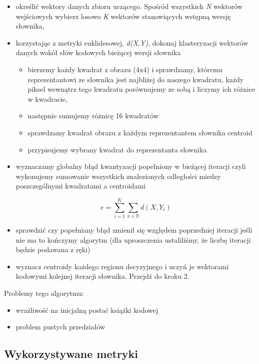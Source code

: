 \documentclass{article}
\begin{document}
\begin{itemize} 
\item określić wektory danych zbioru uczącego. Spośród wszystkich \textit{N} wektorów wejściowych wybierz losowo \textit{K} wektorów stanowiących wstępną wersję słownika,
\item korzystając z metryki euklidesowej, \textit{d(X,Y)}, dokonaj klasteryzacji wektorów danych wokół słów kodowych bieżącej wersji słownika
     \begin{itemize}
        \item bierzemy każdy kwadrat z obrazu (4x4) i sprawdzamy, któremu reprezentantowi ze słownika jest najbliżej do naszego kwadratu, każdy piksel wewnątrz tego kwadratu porównujemy ze sobą i liczymy ich różnice w kwadracie,
        \item następnie sumujemy różnicę 16 kwadratów
        \item sprawdzamy kwadrat obrazu z każdym reprezentantem słownika centroid
        \item przypisujemy wybrany kwadrat do reprezentanta słownika
     \end{itemize}
\item wyznaczamy globalny błąd kwantyzacji popełniony w bieżącej iteracji czyli wykonujemy sumowanie wszystkich znalezionych odległości miedzy poszczególnymi kwadratami a centroidami 
 
\begin{equation}
e = \sum_{i=1}^K \sum_{x\in\mathbb{R}} d(X, Y_{i}) 
\end{equation}

\item sprawdzić czy popełniany błąd zmienił się względem poprzedniej iteracji jeśli nie ma to kończymy algorytm (dla uproszczenia ustaliliśmy, że liczbę iteracji będzie podawana z ręki)
\item wyznacz centroidy każdego regionu decyzyjnego i uczyń je wektorami kodowymi kolejnej iteracji słownika. Przejdź do kroku 2. 
\end{itemize}
 
Problemy tego algorytmu:

\begin{itemize}
	\item wrażliwość na inicjalną postać książki kodowej 
	\item problem pustych przedziałów 
\end{itemize}

\subsection{Wykorzystywane metryki}
\end{document}
